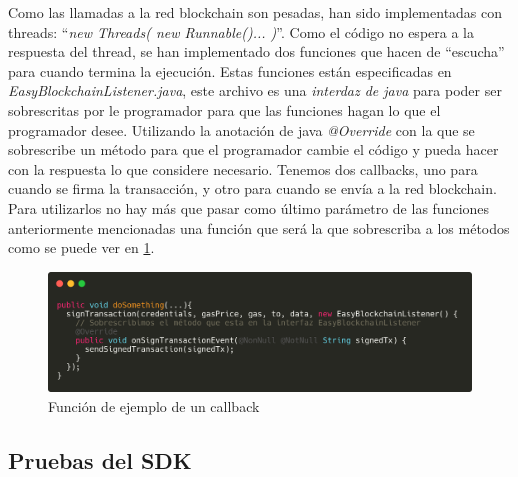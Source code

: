 Como las llamadas a la red blockchain son pesadas, han sido implementadas con threads: ``\textit{new Threads( new Runnable(){...} )}''. Como el código no espera a la respuesta del thread, se han implementado dos funciones que hacen de ``escucha'' para cuando termina la ejecución. Estas funciones están especificadas en \emph{EasyBlockchainListener.java}, este archivo es una \emph{interdaz de java} para poder ser sobrescritas por le programador para que las funciones hagan lo que el programador desee. Utilizando la anotación de java \textit{@Override} con la que se sobrescribe un método para que el programador cambie el código y pueda hacer con la respuesta lo que considere necesario. Tenemos dos callbacks, uno para cuando se firma la transacción, y otro para cuando se envía a la red blockchain. Para utilizarlos no hay más que pasar como último parámetro de las funciones anteriormente mencionadas una función que será la que sobrescriba a los métodos como se puede ver en \ref{fig:callback}.


\begin{figure}[h!]
  \centering
  \includegraphics[width=0.8\linewidth]{figs/Desarrollo/SDK/callback}
  \caption[Función de ejemplo de un callback]{Función de ejemplo de un callback}
  \label{fig:callback}
\end{figure}

\subsection{Pruebas del SDK}


